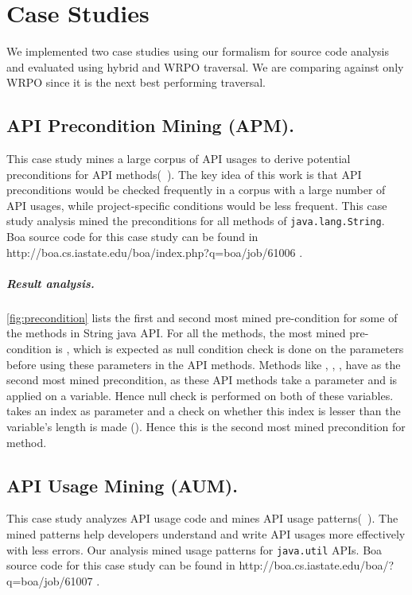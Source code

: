 \chapter{Case Studies}
\label{sec:case-studies}



We implemented two case studies using our formalism for source 
code analysis and evaluated using hybrid and WRPO traversal. We are comparing 
against only WRPO since it is the next best performing traversal. 

\section{API Precondition Mining (APM).} 
This case study mines a large corpus 
of API usages to derive potential preconditions for API methods(~\cite{nguyen2014mining}). 
The key idea of this work is that API preconditions would be checked frequently in a 
corpus with a large number of API usages, while project-specific 
conditions would be less frequent. 
%
This case study analysis mined the preconditions for all methods of 
\lstinline|java.lang.String|. Boa source code for this case study can be found in http://boa.cs.iastate.edu/boa/index.php?q=boa/job/61006 .

\paragraph{Result analysis.} \autoref{fig:precondition} lists the first and second most mined pre-condition for some of the methods in String java API. For all the methods, the most mined pre-condition is , which is expected as null condition check is done on the parameters before using these parameters in the API methods. Methods like , , ,  have  as the second most mined precondition, as these API methods take a parameter and is applied on a variable. Hence null check is performed on both of these variables.  takes an index as parameter and a check on whether this index is lesser than the variable's length is made (). Hence this is the second most mined precondition for  method.

\section{API Usage Mining (AUM).} This case study analyzes API usage code and 
mines API usage patterns(~\cite{zhong2009mapo}). The mined patterns help 
developers understand and write API usages more effectively 
with less errors. Our analysis mined usage patterns for 
\lstinline|java.util| APIs.  Boa source code for this case study can be found in http://boa.cs.iastate.edu/boa/?q=boa/job/61007 .

